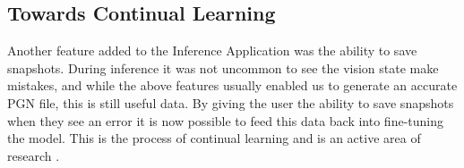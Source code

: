 \subsection{Towards Continual Learning}
Another feature added to the Inference Application was the ability to save snapshots.  During inference it was not uncommon to see the vision state make mistakes,
and while the above features usually enabled us to generate an accurate PGN file, this is still useful data.
By giving the user the ability to save snapshots when they see an error it is now possible to feed this data back into fine-tuning the model.  This is the process of 
continual learning and is an active area of research \cite{}.